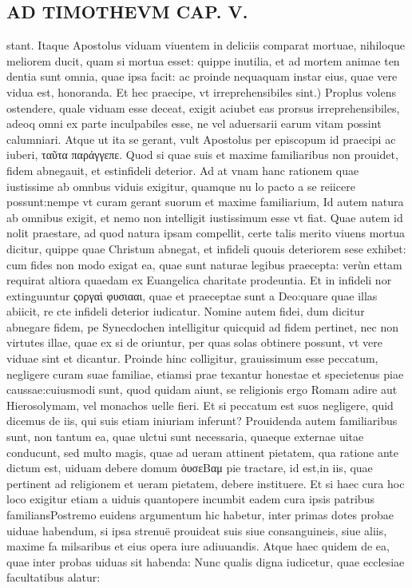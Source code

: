 \documentclass{article}
\begin{document}
\begin{pages}
\section*{AD TIMOTHEVM CAP. V. }
\marginpar{[ p.108 ]}\pstart stant. Itaque Apostolus viduam viuentem in deliciis comparat mortuae, nihiloque meliorem ducit, quam si mortua esset: quippe inutilia, et ad mortem animae ten dentia sunt omnia, quae ipsa facit: ac proinde nequaquam instar eius, quae vere vidua est, honoranda.  \pend\pstart Et hec praecipe, vt irreprehensibiles sint.) Proplus volens ostendere, quale viduam esse deceat, exigit aciubet eas prorsus irreprehensibiles, adeoq omni ex parte inculpabiles esse, ne vel aduersarii earum vitam possint calumniari. Atque ut ita se gerant, vult Apostolus per episcopum id praecipi ac iuberi, ταῦτα παράγγεπε.  \pend\pstart Quod si quae suis et maxime familiaribus non prouidet, fidem abnegauit, et estinfideli deterior. Ad at vnam hanc rationem quae iustissime ab omnbus viduis exigitur, quamque nu lo pacto a se reiicere possunt:nempe vt curam gerant suorum et maxime familiarium, Id autem natura ab omnibus exigit, et nemo non intelligit iustissimum esse vt fiat. Quae autem id nolit praestare, ad quod natura ipsam compellit, certe talis merito viuens mortua dicitur, quippe quae Christum abnegat, et infideli quouis deteriorem sese exhibet: cum fides non modo exigat ea, quae sunt naturae legibus praecepta: verùn ettam requirat altiora quaedam ex Euangelica charitate prodeuntia. Et in infideli nor extinguuntur ςοργαὶ φυσιααι, quae et praeceptae sunt a Deo:quare quae illas abiicit, re cte infideli deterior iudicatur. Nomine autem fidei, dum dicitur abnegare fidem, pe Synecdochen intelligitur quicquid ad fidem pertinet, nec non virtutes illae, quae ex si de oriuntur, per quas solas obtinere possunt, vt vere viduae sint et dicantur. Proinde hinc colligitur, grauissimum esse peccatum, negligere curam suae familiae, etiamsi prae texantur honestae et specietenus piae caussae:cuiusmodi sunt, quod quidam aiunt, se religionis ergo Romam adire aut Hierosolymam, vel monachos uelle fieri. Et si peccatum est suos negligere, quid dicemus de iis, qui suis etiam iniuriam inferunt? Prouidenda autem familiaribus sunt, non tantum ea, quae ulctui sunt necessaria, quaeque externae uitae conducunt, sed multo magis, quae ad ueram attinent pietatem, qua ratione ante dictum est, uiduam debere domum ὁυσεBαμ pie tractare, id est,in iis, quae pertinent ad religionem et ueram pietatem, debere instituere. Et si haec cura hoc loco exigitur etiam a uiduis quantopere incumbit eadem cura ipsis patribus familiansPostremo euidens argumentum hic habetur, inter primas dotes probae uiduae habendum, si ipsa strenuë prouideat suis siue consanguineis, siue aliis, maxime fa milsaribus et eius opera iure adiuuandis. Atque haec quidem de ea, quae inter probas uiduas sit habenda: Nunc qualis digna iudicetur, quae ecclesiae facultatibus alatur:  \pend
{}
{}

\end{pages}
\end{document}
